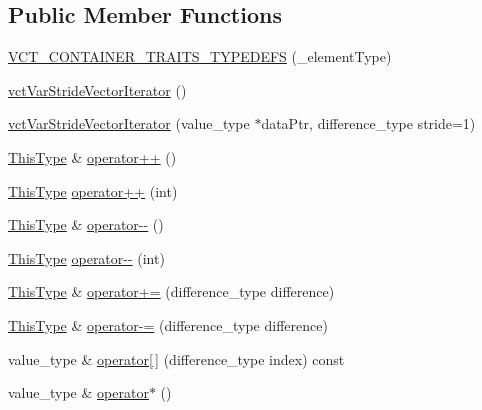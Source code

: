 \subsection*{Public Member Functions}
\begin{DoxyCompactItemize}
\item 
\hyperlink{classvct_var_stride_vector_iterator_adf8cc207f0c088e290ea47d08fb24d2e}{V\-C\-T\-\_\-\-C\-O\-N\-T\-A\-I\-N\-E\-R\-\_\-\-T\-R\-A\-I\-T\-S\-\_\-\-T\-Y\-P\-E\-D\-E\-F\-S} (\-\_\-element\-Type)
\item 
\hyperlink{classvct_var_stride_vector_iterator_af3b7bbb7a0cfb8e7bf3b85b7a951bc10}{vct\-Var\-Stride\-Vector\-Iterator} ()
\item 
\hyperlink{classvct_var_stride_vector_iterator_ae7d26455e71328a58a113385f2a98496}{vct\-Var\-Stride\-Vector\-Iterator} (value\-\_\-type $\ast$data\-Ptr, difference\-\_\-type stride=1)
\item 
\hyperlink{classvct_var_stride_vector_const_iterator_afd99aad7dc756d227f4fb02cd569d00a}{This\-Type} \& \hyperlink{classvct_var_stride_vector_iterator_a09a43ca7a4fd95c025d0ff39b7876334}{operator++} ()
\item 
\hyperlink{classvct_var_stride_vector_const_iterator_afd99aad7dc756d227f4fb02cd569d00a}{This\-Type} \hyperlink{classvct_var_stride_vector_iterator_a06474c8b6ec609c776944db24282d225}{operator++} (int)
\item 
\hyperlink{classvct_var_stride_vector_const_iterator_afd99aad7dc756d227f4fb02cd569d00a}{This\-Type} \& \hyperlink{classvct_var_stride_vector_iterator_a0a0fce130683a0742f48c2a6c9b9528c}{operator-\/-\/} ()
\item 
\hyperlink{classvct_var_stride_vector_const_iterator_afd99aad7dc756d227f4fb02cd569d00a}{This\-Type} \hyperlink{classvct_var_stride_vector_iterator_a20fd7d0ee7d47e6c84e123a6b7e0723c}{operator-\/-\/} (int)
\item 
\hyperlink{classvct_var_stride_vector_const_iterator_afd99aad7dc756d227f4fb02cd569d00a}{This\-Type} \& \hyperlink{classvct_var_stride_vector_iterator_add0300a12f45cfa3ddf55ea294c529fe}{operator+=} (difference\-\_\-type difference)
\item 
\hyperlink{classvct_var_stride_vector_const_iterator_afd99aad7dc756d227f4fb02cd569d00a}{This\-Type} \& \hyperlink{classvct_var_stride_vector_iterator_aa7aa582293555763637360d69df9add0}{operator-\/=} (difference\-\_\-type difference)
\item 
value\-\_\-type \& \hyperlink{classvct_var_stride_vector_iterator_a1a58bcd907b9df2ab275366bf468c0b8}{operator\mbox{[}$\,$\mbox{]}} (difference\-\_\-type index) const 
\item 
value\-\_\-type \& \hyperlink{classvct_var_stride_vector_iterator_a6c32786e298874d71e351bbcdb619873}{operator$\ast$} ()
\end{DoxyCompactItemize}
